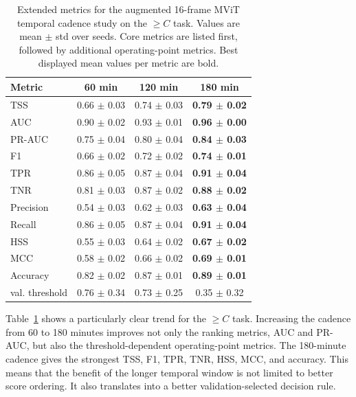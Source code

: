\begin{table}[!htbp]
\centering
\footnotesize
\setlength{\tabcolsep}{4pt}
\caption{Extended metrics for the augmented 16-frame MViT temporal cadence study on the $\geq C$ task. Values are mean $\pm$ std over seeds. Core metrics are listed first, followed by additional operating-point metrics. Best displayed mean values per metric are bold.}
\label{tab:appendix_video_full_c}
\begin{tabular}{lccc}
\toprule
Metric & 60 min & 120 min & 180 min \\
\midrule
TSS & 0.66 $\pm$ 0.03 & 0.74 $\pm$ 0.03 & \textbf{0.79 $\pm$ 0.02} \\
AUC & 0.90 $\pm$ 0.02 & 0.93 $\pm$ 0.01 & \textbf{0.96 $\pm$ 0.00} \\
PR-AUC & 0.75 $\pm$ 0.04 & 0.80 $\pm$ 0.04 & \textbf{0.84 $\pm$ 0.03} \\
F1 & 0.66 $\pm$ 0.02 & 0.72 $\pm$ 0.02 & \textbf{0.74 $\pm$ 0.01} \\
TPR & 0.86 $\pm$ 0.05 & 0.87 $\pm$ 0.04 & \textbf{0.91 $\pm$ 0.04} \\
TNR & 0.81 $\pm$ 0.03 & 0.87 $\pm$ 0.02 & \textbf{0.88 $\pm$ 0.02} \\
Precision & 0.54 $\pm$ 0.03 & 0.62 $\pm$ 0.03 & \textbf{0.63 $\pm$ 0.04} \\
Recall & 0.86 $\pm$ 0.05 & 0.87 $\pm$ 0.04 & \textbf{0.91 $\pm$ 0.04} \\
HSS & 0.55 $\pm$ 0.03 & 0.64 $\pm$ 0.02 & \textbf{0.67 $\pm$ 0.02} \\
MCC & 0.58 $\pm$ 0.02 & 0.66 $\pm$ 0.02 & \textbf{0.69 $\pm$ 0.01} \\
Accuracy & 0.82 $\pm$ 0.02 & 0.87 $\pm$ 0.01 & \textbf{0.89 $\pm$ 0.01} \\
val. threshold & 0.76 $\pm$ 0.34 & 0.73 $\pm$ 0.25 & 0.35 $\pm$ 0.32 \\
\bottomrule
\end{tabular}
\end{table}

\FloatBarrier

Table~\ref{tab:appendix_video_full_c} shows a particularly clear trend for the $\geq C$ task. Increasing the cadence from 60 to 180 minutes improves not only the ranking metrics, AUC and PR-AUC, but also the threshold-dependent operating-point metrics. The 180-minute cadence gives the strongest TSS, F1, TPR, TNR, HSS, MCC, and accuracy. This means that the benefit of the longer temporal window is not limited to better score ordering. It also translates into a better validation-selected decision rule.

